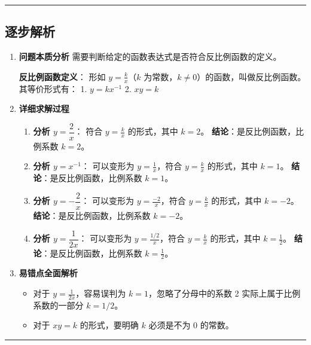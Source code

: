 \documentclass[UTF8]{ctexart}
\newenvironment{redenv}{\color{red}}{}
\newenvironment{detailedanalysis}{%
    \color{red}
    \begin{enumerate}[label=\textbf{第\arabic*步：}, leftmargin=*, align=left, itemsep=1.5ex]
}{%
    \end{enumerate}
}
\newenvironment{conceptbox}{%
    \begin{tcolorbox}[colback=red!5, colframe=red!50!black, title=概念解析, fonttitle=\bfseries]
}{%
    \end{tcolorbox}
}
\newcommand{\problemrule}{\noindent\rule{\textwidth}{1.5pt}\vspace{-0.8em}}
\newcommand{\analysisrule}{\noindent\rule{\textwidth}{0.8pt}\vspace{-0.8em}}
\begin{document}
\begin{redenv}
\analysisrule
\subsection*{逐步解析}

\begin{detailedanalysis}
\item \textbf{问题本质分析}
需要判断给定的函数表达式是否符合反比例函数的定义。
\begin{conceptbox}
\textbf{反比例函数定义}：
形如 $y = \frac{k}{x}$（$k$ 为常数，$k \neq 0$）的函数，叫做反比例函数。
其等价形式有：
1. $y = kx^{-1}$
2. $xy = k$
\end{conceptbox}

\item \textbf{详细求解过程}
\begin{enumerate}[label=(\arabic*)]
    \item \textbf{分析 $y = \dfrac{2}{x}$}：
    符合 $y = \frac{k}{x}$ 的形式，其中 $k=2$。
    \textbf{结论}：是反比例函数，比例系数 $k=2$。

    \item \textbf{分析 $y = x^{-1}$}：
    可以变形为 $y = \frac{1}{x}$，符合 $y = \frac{k}{x}$ 的形式，其中 $k=1$。
    \textbf{结论}：是反比例函数，比例系数 $k=1$。

    \item \textbf{分析 $y = -\dfrac{2}{x}$}：
    可以变形为 $y = \frac{-2}{x}$，符合 $y = \frac{k}{x}$ 的形式，其中 $k=-2$。
    \textbf{结论}：是反比例函数，比例系数 $k=-2$。

    \item \textbf{分析 $y = \dfrac{1}{2x}$}：
    可以变形为 $y = \frac{1/2}{x}$，符合 $y = \frac{k}{x}$ 的形式，其中 $k=\frac{1}{2}$。
    \textbf{结论}：是反比例函数，比例系数 $k=\frac{1}{2}$。
\end{enumerate}

\item \textbf{易错点全面解析}
\begin{itemize}
    \item 对于 $y=\frac{1}{2x}$，容易误判为 $k=1$，忽略了分母中的系数 2 实际上属于比例系数的一部分 $k=1/2$。
    \item 对于 $xy=k$ 的形式，要明确 $k$ 必须是不为 0 的常数。
\end{itemize}
\end{detailedanalysis}
\end{redenv}

\problemrule
\end{document}
